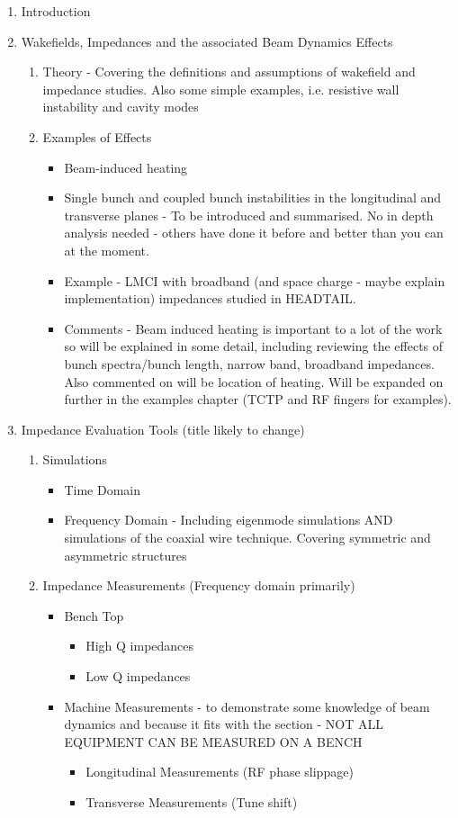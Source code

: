 \documentclass[12pt,PhD]{Thesis}
\begin{document}
\begin{enumerate}
\item{Introduction}
\item{Wakefields, Impedances and the associated Beam Dynamics Effects}
\begin{enumerate}
\item{Theory - Covering the definitions and assumptions of wakefield and impedance studies. Also some simple examples, i.e. resistive wall instability and cavity modes}
\item{Examples of Effects}
\begin{itemize}
\item{Beam-induced heating}
\item{Single bunch and coupled bunch instabilities in the longitudinal and transverse planes - To be introduced and summarised. No in depth analysis needed - others have done it before and better than you can at the moment.}
\item{Example - LMCI with broadband (and space charge - maybe explain implementation) impedances studied in HEADTAIL.}
\item{Comments - Beam induced heating is important to a lot of the work so will be explained in some detail, including reviewing the effects of bunch spectra/bunch length, narrow band, broadband impedances. Also commented on will be location of heating. Will be expanded on further in the examples chapter (TCTP and RF fingers for examples).}
\end{itemize}
\end{enumerate}
\item{Impedance Evaluation Tools (title likely to change)}
\begin{enumerate}
\item{Simulations}
\begin{itemize}
\item{Time Domain}
\item{Frequency Domain - Including eigenmode simulations AND simulations of the coaxial wire technique. Covering symmetric and asymmetric structures}
\end{itemize}
\item{Impedance Measurements (Frequency domain primarily)}
\begin{itemize}
\item{Bench Top}
\begin{itemize}
\item{High Q impedances}
\item{Low Q impedances}
\end{itemize}
\item{Machine Measurements - to demonstrate some knowledge of beam dynamics and because it fits with the section - NOT ALL EQUIPMENT CAN BE MEASURED ON A BENCH}
\begin{itemize}
\item{Longitudinal Measurements (RF phase slippage)}
\item{Transverse Measurements (Tune shift)}
\end{itemize}
\end{itemize}
\end{enumerate}


\end{enumerate}
\end{document}
